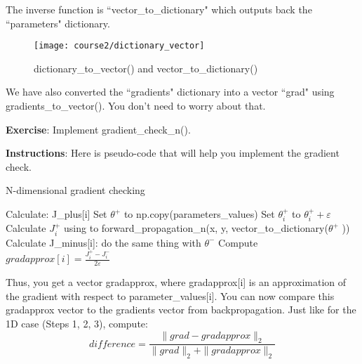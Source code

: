 The inverse function is ``vector\_to\_dictionary" which outputs back the ``parameters" dictionary.

\begin{figure}[h]
\begin{center}
\texttt{[image: course2/dictionary\_vector]}
\caption{dictionary\_to\_vector() and vector\_to\_dictionary()}
\label{dictionary_to_vector}
\end{center}
\end{figure}


We have also converted the ``gradients" dictionary into a vector ``grad" using gradients\_to\_vector(). You don't need to worry about that.

{\textbf {Exercise}}: Implement gradient\_check\_n().

{\textbf {Instructions}}: Here is pseudo-code that will help you implement the gradient check.


\begin{algorithm}[H]
\caption{N-dimensional gradient checking}
\begin{algorithmic}[1]
  \State Calculate: J\_plus[i]
  \State \hspace{0.5cm} Set $\theta^{+}$ to np.copy(parameters\_values)
  \State \hspace{0.5cm} Set $\theta^{+}_i$ to $\theta^{+}_i + \varepsilon$
  \State \hspace{0.5cm} Calculate $J^{+}_i$ using to forward\_propagation\_n(x, y, vector\_to\_dictionary($\theta^{+}$ ))
  \State Calculate J\_minus[i]:
  \State \hspace{0.5cm} do the same thing with $\theta^{-}$
  \State Compute $gradapprox[i] = \frac{J^{+}_i - J^{-}_i}{2 \varepsilon}$
  \EndFor
\end{algorithmic}
\end{algorithm}


Thus, you get a vector gradapprox, where gradapprox[i] is an approximation of the gradient with respect to parameter\_values[i]. You can now compare this gradapprox vector to the gradients vector from backpropagation. Just like for the 1D case (Steps 1, 2, 3), compute:
\begin{equation}
difference = \frac {\| grad - gradapprox \|_2}{\| grad \|_2 + \| gradapprox \|_2 }
\end{equation}

